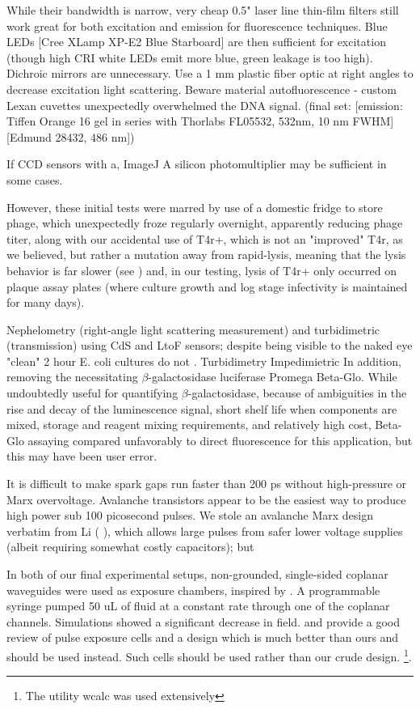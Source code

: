 \documentclass[paper.tex]{subfiles}
\begin{document}
While their bandwidth is narrow, very cheap 0.5" laser line thin-film filters still work great for both excitation and emission for fluorescence techniques. Blue LEDs [Cree XLamp XP-E2 Blue Starboard] are then sufficient for excitation (though high CRI white LEDs emit more blue, green leakage is too high). Dichroic mirrors are unnecessary. Use a 1 mm plastic fiber optic at right angles to decrease excitation light scattering. Beware material autofluorescence - custom Lexan cuvettes unexpectedly overwhelmed the DNA signal. (final set: [emission: Tiffen Orange 16 gel in series with Thorlabs FL05532, 532nm, 10 nm FWHM] [Edmund 28432, 486 nm])

If CCD sensors with a, ImageJ \cite{Image2012} A silicon photomultiplier may be sufficient in some cases.

However, these initial tests were marred by use of a domestic fridge to store phage, which unexpectedly froze regularly overnight, apparently reducing phage titer, along with our accidental use of T4r+, which is not an "improved" T4r, as we believed, but rather a mutation away from rapid-lysis, meaning that the lysis behavior is far slower (see \cite{Spontaneous1946}) and, in our testing, lysis of T4r+ only occurred on plaque assay plates (where culture growth and log stage infectivity is maintained for many days). 

Nephelometry (right-angle light scattering measurement) and turbidimetric (transmission) using CdS and LtoF sensors; despite being visible to the naked eye "clean" 2 hour E. coli cultures do not .  Turbidimetry Impedimietric In addition, removing the necessitating 
$\beta$-galactosidase luciferase Promega Beta-Glo\cite{rapid2014}. While undoubtedly useful for quantifying $\beta$-galactosidase, because of ambiguities in the rise and decay of the luminescence signal, short shelf life when components are mixed, storage and reagent mixing requirements, and relatively high cost, Beta-Glo assaying compared unfavorably to direct fluorescence for this application, but this may have been user error.


It is difficult to make spark gaps run faster than 200 ps without high-pressure or Marx overvoltage. Avalanche transistors appear to be the easiest way to produce high power sub 100 picosecond pulses. We stole an avalanche Marx design verbatim from Li (\cite{Development2016b} \cite{Design2018c}), which allows large pulses from safer lower voltage supplies (albeit requiring somewhat costly capacitors); but 

In both of our final experimental setups, non-grounded, single-sided coplanar waveguides were used as exposure chambers, inspired by \cite{Microwave2007}. A programmable syringe pumped 50 uL of fluid at a constant rate through one of the coplanar channels. Simulations showed a significant decrease in field. \cite{Microchamber2011} and \cite{Characterization2012} provide a good review of pulse exposure cells and a design which is much better than ours and should be used instead. Such cells should be used rather than our crude design. \footnote{The utility wcalc was used extensively}.
\end{document}
